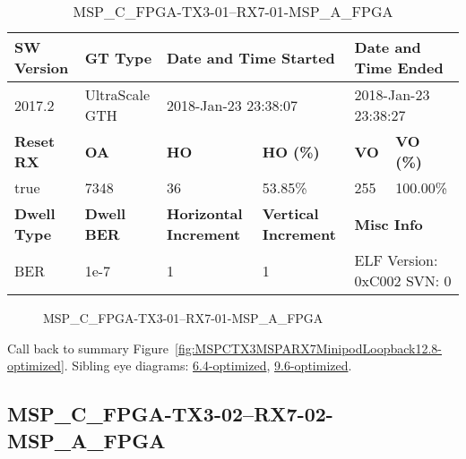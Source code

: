\begin{table}[h]
\centering
\caption{MSP\_C\_FPGA-TX3-01--RX7-01-MSP\_A\_FPGA}
\label{tab:MSPCFPGATX301RX701MSPAFPGA12.8-optimized}
\begin{tabular}{@{}|l|l|l|l|l|l|@{}}
\toprule
\textbf{SW Version}                & \textbf{GT Type}   & \multicolumn{2}{l|}{\textbf{Date and Time Started}}            & \multicolumn{2}{l|}{\textbf{Date and Time Ended}}        \\ \midrule
2017.2                       & UltraScale GTH          & \multicolumn{2}{l|}{2018-Jan-23 23:38:07}                   & \multicolumn{2}{l|}{2018-Jan-23 23:38:27}               \\ \midrule
\textbf{Reset RX}                  & \textbf{OA} & \textbf{HO}   & \textbf{HO (\%)} & \textbf{VO} & \textbf{VO (\%)} \\ \midrule
true & 7348        & 36          & 53.85\%        & 255        & 100.00\%       \\ \midrule
\textbf{Dwell Type}                & \textbf{Dwell BER} & \textbf{Horizontal Increment} & \textbf{Vertical Increment}    & \multicolumn{2}{l|}{\textbf{Misc Info}}                  \\ \midrule
BER                            & 1e-7        & 1        & 1           & \multicolumn{2}{l|}{ELF Version: 0xC002 SVN: 0}                         \\ \bottomrule
\end{tabular}
\end{table}

\begin{figure}[h]
\caption{MSP\_C\_FPGA-TX3-01--RX7-01-MSP\_A\_FPGA} \label{fig:MSPCFPGATX301RX701MSPAFPGA12.8-optimized}
\end{figure}

Call back to summary Figure~\ref{fig:MSPCTX3MSPARX7MinipodLoopback12.8-optimized}.
Sibling eye diagrams: \hyperref[sec:MSPCFPGATX301RX701MSPAFPGA6.4-optimized]{6.4-optimized}, \hyperref[sec:MSPCFPGATX301RX701MSPAFPGA9.6-optimized]{9.6-optimized}.

\clearpage
\newpage


\subsection{MSP\_C\_FPGA-TX3-02--RX7-02-MSP\_A\_FPGA}\label{sec:MSPCFPGATX302RX702MSPAFPGA12.8-optimized}

